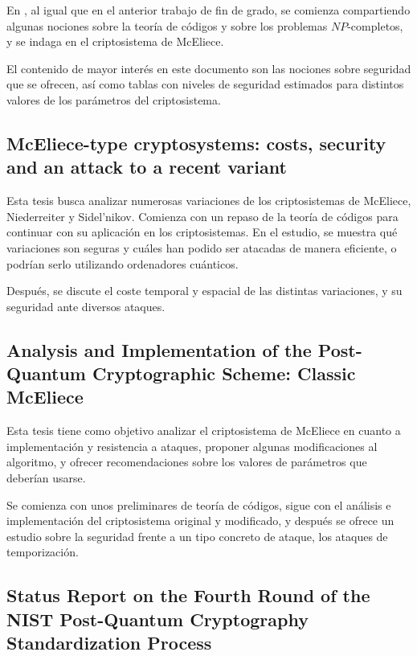 En \autocite{Codes2024}, al igual que en el anterior trabajo de fin de grado, se comienza compartiendo algunas nociones sobre la teoría de códigos y sobre los problemas $NP$-completos, y se indaga en el criptosistema de McEliece.

El contenido de mayor interés en este documento son las nociones sobre seguridad que se ofrecen, así como tablas con niveles de seguridad estimados para distintos valores de los parámetros del criptosistema.

\subsection{McEliece-type cryptosystems: costs, security and an attack to a recent variant}

Esta tesis \autocite{costs} busca analizar numerosas variaciones de los criptosistemas de McEliece, Niederreiter y Sidel'nikov. Comienza con un repaso de la teoría de códigos para continuar con su aplicación en los criptosistemas. En el estudio, se muestra qué variaciones son seguras y cuáles han podido ser atacadas de manera eficiente, o podrían serlo utilizando ordenadores cuánticos.

Después, se discute el coste temporal y espacial de las distintas variaciones, y su seguridad ante diversos ataques.

\subsection{Analysis and Implementation of the Post-Quantum Cryptographic Scheme: Classic McEliece}

Esta tesis \autocite{implementation} tiene como objetivo analizar el criptosistema de McEliece en cuanto a implementación y resistencia a ataques, proponer algunas modificaciones al algoritmo, y ofrecer recomendaciones sobre los valores de parámetros que deberían usarse.

Se comienza con unos preliminares de teoría de códigos, sigue con el análisis e implementación del criptosistema original y modificado, y después se ofrece un estudio sobre la seguridad frente a un tipo concreto de ataque, los ataques de temporización.

\subsection{Status Report on the Fourth Round of the NIST Post-Quantum Cryptography Standardization Process}

